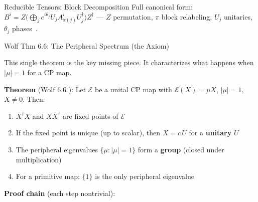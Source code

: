 \documentclass[aspectratio=169,10pt]{beamer}
\begin{document}
\begin{frame}{Reducible Tensors: Block Decomposition}
    \vspace{0.15em}
    {\scriptsize\textcolor{dimwhite}{Full canonical form:
    $B^i = Z\bigl(\bigoplus_j e^{i\theta_j} U_j A^i_{\pi(j)} U_j^\dagger\bigr)Z^\dagger$
    --- $Z$ permutation, $\pi$ block relabeling, $U_j$ unitaries,
    $\theta_j$ phases~\cite{Cirac2017Irreducible,Cirac2021Matrix}.}}
\end{frame}

\begin{frame}{Wolf Thm 6.6: The Peripheral Spectrum (the Axiom)}
    \vspace{-0.7em}

    {\small This single theorem is the \textcolor{softred}{key missing piece}.
    It characterizes what happens when $|\mu| = 1$ for a CP map.}

    \vspace{0.2em}
    \colorbox{cardbg}{\parbox{0.93\textwidth}{%
    \textbf{Theorem} (Wolf 6.6 \cite{Wolf2012Quantum}):
    {\small Let $\mathcal{E}$ be a unital CP map with
    $\mathcal{E}(X) = \mu X$, $|\mu| = 1$, $X \neq 0$. Then:}
    \begin{enumerate}\itemsep0.02em\small
        \item $X^\dagger X$ and $X X^\dagger$ are fixed points of $\mathcal{E}$
        \item If the fixed point is unique (up to scalar), then
            $X = c\, U$ for a \textbf{unitary} $U$
        \item The peripheral eigenvalues $\{\mu : |\mu|=1\}$
            form a \textbf{group} (closed under multiplication)
        \item For a primitive map: $\{1\}$ is the only peripheral eigenvalue
    \end{enumerate}}}

    \vspace{0.3em}
    \textbf{Proof chain} (each step nontrivial):


\end{frame}
\end{document}
